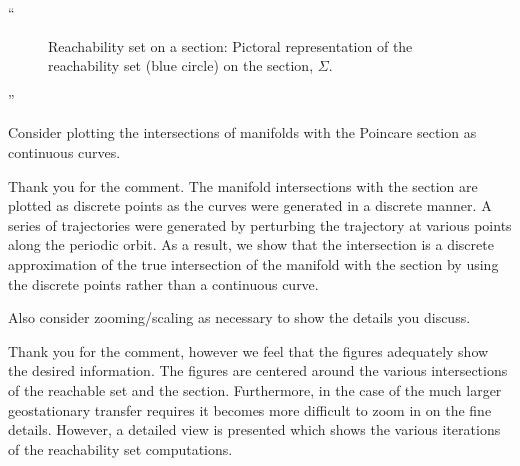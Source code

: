 \documentclass[11pt]{article}
\newenvironment{correction}{\begin{list}{}{\setlength{\leftmargin}{1cm}\setlength{\rightmargin}{1cm}}\vspace{\parsep}\item[]``}{''\end{list}}
\begin{document}
\begin{enumerate}
\begin{correction}
\begin{figure}
\begin{scaletikzpicturetowidth}{0.5\textwidth}
        \end{scaletikzpicturetowidth}
        \caption{Reachability set on a \Poincare section: Pictoral representation of the reachability set (blue circle) on the \Poincare section, \(\Sigma\). 
        }
\end{figure}
\end{correction}
\item
    \begin{itshape}
Consider plotting the intersections of manifolds with the Poincare section as continuous curves.  
\end{itshape}

Thank you for the comment.
The manifold intersections with the \Poincare section are plotted as discrete points as the curves were generated in a discrete manner. 
A series of trajectories were generated by perturbing the trajectory at various points along the periodic orbit. 
As a result, we show that the intersection is a discrete approximation of the true intersection of the manifold with the section by using the discrete points rather than a continuous curve. 

\item
    \begin{itshape}
Also consider zooming/scaling as necessary to show the details you discuss.
\end{itshape}

Thank you for the comment, however we feel that the figures adequately show the desired information.
The figures are centered around the various intersections of the reachable set and the \Poincare section.
Furthermore, in the case of the much larger geostationary transfer requires it becomes more difficult to zoom in on the fine details.
However, a detailed view is presented which shows the various iterations of the reachability set computations.


\end{enumerate}
\end{document}
